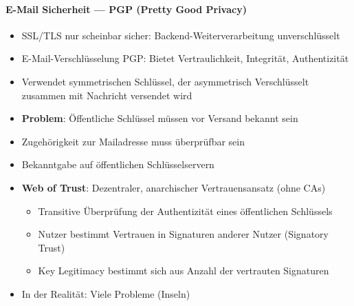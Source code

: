 \paragraph{E-Mail Sicherheit --- PGP (Pretty Good Privacy)}
\begin{itemize}
	\item SSL/TLS nur scheinbar sicher: Backend-Weiterverarbeitung unverschlüsselt
	\item E-Mail-Verschlüsselung PGP: Bietet Vertraulichkeit, Integrität, Authentizität
	\item Verwendet symmetrischen Schlüssel, der asymmetrisch Verschlüsselt zusammen mit Nachricht versendet wird
	\item \textbf{Problem}: Öffentliche Schlüssel müssen vor Versand bekannt sein
	\item Zugehörigkeit zur Mailadresse muss überprüfbar sein
	\item Bekanntgabe auf öffentlichen Schlüsselservern
	\item \textbf{Web of Trust}: Dezentraler, anarchischer Vertrauensansatz (ohne CAs)
	\begin{itemize}
    \item Transitive Überprüfung der Authentizität eines öffentlichen Schlüssels
    \item Nutzer bestimmt Vertrauen in Signaturen anderer Nutzer (Signatory Trust)
    \item Key Legitimacy bestimmt sich aus Anzahl der vertrauten Signaturen
  \end{itemize}
	\item In der Realität: Viele Probleme (Inseln)
\end{itemize}

